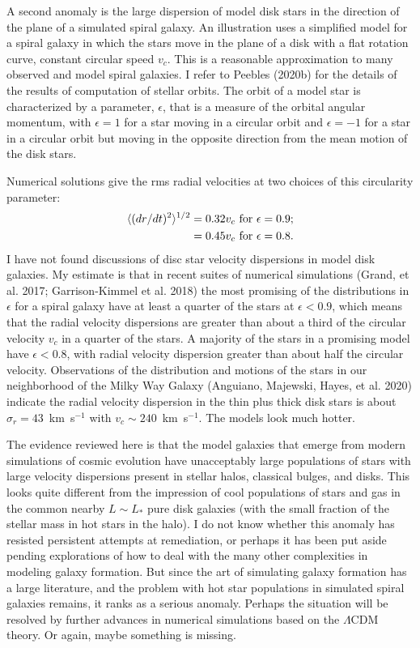 \documentclass[fleqn,usenatbib]{mnras}
\begin{document}
A second anomaly is the large dispersion of model disk stars in the direction of the plane of a simulated spiral galaxy. An illustration uses a simplified model for a spiral galaxy in which the stars move in the plane of a disk with a flat rotation curve, constant circular speed $v_c$. This is a reasonable approximation to many observed and model spiral galaxies. I refer to Peebles (2020b) for the details of the results of computation of stellar orbits. The orbit of a model star is characterized by a parameter, $\epsilon$, that is a measure of the orbital angular momentum, with $\epsilon = 1$ for a star moving in a circular orbit and $\epsilon = -1$ for a star in a circular orbit but moving in the opposite direction from the mean motion of the disk stars.  

Numerical solutions give the rms radial velocities at two choices of this circularity parameter: 
\begin{align}
\langle (dr/dt)^2\rangle^{1/2} &= 0.32 v_c\hbox{ for } \epsilon = 0.9; \nonumber\\
	&= 0.45 v_c \hbox{ for } \epsilon = 0.8. \label{eq:radialveldispn}
\end{align}
I have not found discussions of disc star velocity dispersions in model disk galaxies. My estimate is that in recent suites of numerical simulations (Grand, et al. 2017; Garrison-Kimmel et al. 2018) the most promising of the distributions in $\epsilon$ for a spiral galaxy have at least a quarter of the stars at $\epsilon<0.9$, which means that the radial velocity dispersions are greater than about a third of the circular velocity $v_c$ in a quarter of the stars. A majority of the stars in a promising model have $\epsilon<0.8$, with radial velocity dispersion greater than about half the circular velocity. Observations of the distribution and motions of the stars in our neighborhood of the Milky Way Galaxy (Anguiano, Majewski, Hayes, et al. 2020) indicate the radial velocity dispersion in the thin plus thick disk stars is about $\sigma_r=43$~km~s$^{-1}$ with $v_c\sim 240$~km~s$^{-1}$. The models look much hotter. 

The evidence reviewed here is that the model galaxies that emerge from modern simulations of cosmic evolution have unacceptably large populations of stars with large velocity dispersions present in stellar halos, classical bulges, and disks. This looks quite different from the impression of cool populations of stars and gas in the common  nearby $L\sim L_\ast$ pure disk galaxies (with the small fraction of the stellar mass in hot stars in the halo). I do not know whether this anomaly has resisted persistent attempts at remediation, or perhaps it has been put aside pending explorations of how to deal with the many other complexities in modeling galaxy formation. But since the art of simulating galaxy formation has a large literature, and the problem with hot star populations in simulated spiral galaxies remains, it ranks as a serious anomaly. Perhaps the situation will  be resolved by further advances in numerical simulations based on the $\Lambda$CDM theory. Or again, maybe something is missing.
\end{document}
